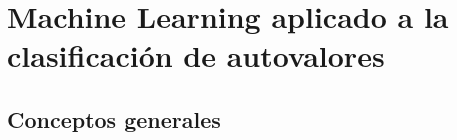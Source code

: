 \chapter{Machine Learning aplicado a la clasificación de autovalores}\label{ch:machinelearning}

\section{Conceptos generales}\label{subc:intro_congen}


